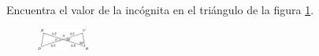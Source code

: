 Encuentra el valor de la incógnita en el triángulo de la figura \ref{fig:angle_triangle_12}.

\begin{minipage}[t][][t]{0.35\textwidth}
    \begin{figure}[H]
\centering
            \includegraphics[width=0.15\textwidth]{../images/angle_triangle_12.png}

        \caption{}
        \label{fig:angle_triangle_12}
    \end{figure}
\end{minipage}\hfill
\begin{minipage}[t][][t]{0.6\textwidth}
    \begin{solutionbox}{4.5cm}

    \end{solutionbox}
\end{minipage}
